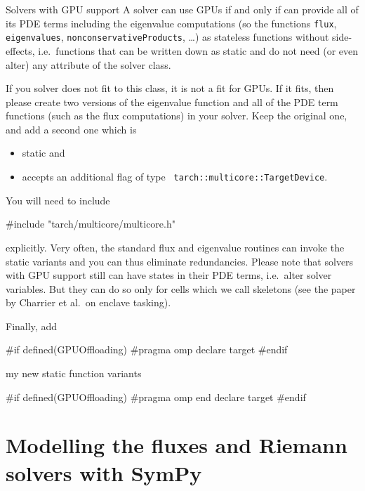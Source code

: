 \begin{definition}{Solvers with GPU support}
 A solver can use GPUs if and only if can provide all of its PDE terms
 including the eigenvalue computations (so the functions \texttt{flux},
 \texttt{eigenvalues}, \texttt{nonconservativeProducts}, \ldots) as stateless
 functions without side-effects, i.e.~functions that can be written down as
 static and do not need (or even alter) any attribute of the solver class.
\end{definition}

\noindent
If you solver does not fit to this class, it is not a fit for GPUs.
If it fits, then please create two versions of the eigenvalue function and all
of the PDE term functions (such as the flux computations) in your solver.
Keep the original one, and add a second one which is 

\begin{itemize}
  \item static and 
  \item accepts an additional flag of type \texttt{
  tarch::multicore::TargetDevice}.
\end{itemize}

\noindent
You will need to include 
\begin{code}
#include "tarch/multicore/multicore.h"
\end{code} 

\noindent
explicitly. Very often, the standard flux and eigenvalue routines can invoke the
static variants and you can thus eliminate redundancies.
Please note that solvers with GPU support still can have states in their PDE
terms, i.e.~alter solver variables.
But they can do so only for cells which we call skeletons (see the paper by
Charrier et al.~on enclave tasking).


Finally, add
\begin{code}
#if defined(GPUOffloading)
#pragma omp declare target
#endif

my new static function variants

#if defined(GPUOffloading)
#pragma omp end declare target
#endif
\end{code} 






\section{Modelling the fluxes and Riemann solvers with SymPy}

